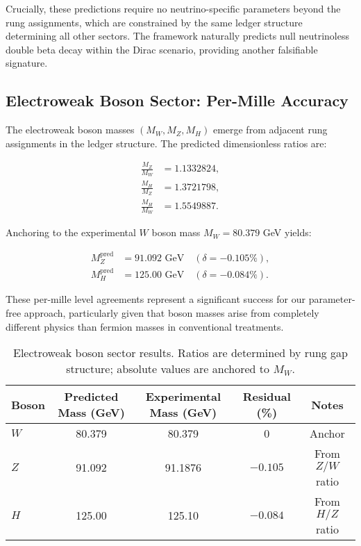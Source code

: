 \documentclass[%
amsmath,amssymb,
aps,
prb,
floatfix,
twocolumn
]{revtex4-2}
\begin{document}
Crucially, these predictions require no neutrino-specific parameters beyond the rung assignments, which are constrained by the same ledger structure determining all other sectors. The framework naturally predicts null neutrinoless double beta decay within the Dirac scenario, providing another falsifiable signature.

\subsection{Electroweak Boson Sector: Per-Mille Accuracy}
\label{subsec:boson_results}

The electroweak boson masses $(M_W, M_Z, M_H)$ emerge from adjacent rung assignments in the ledger structure. The predicted dimensionless ratios are:

\begin{align}
\frac{M_Z}{M_W} &= 1.1332824, \\
\frac{M_H}{M_Z} &= 1.3721798, \\
\frac{M_H}{M_W} &= 1.5549887.
\end{align}

Anchoring to the experimental $W$ boson mass $M_W = 80.379$ GeV yields:

\begin{align}
M_Z^{\text{pred}} &= 91.092 \text{ GeV} \quad (\delta = -0.105\%), \\
M_H^{\text{pred}} &= 125.00 \text{ GeV} \quad (\delta = -0.084\%).
\end{align}

These per-mille level agreements represent a significant success for our parameter-free approach, particularly given that boson masses arise from completely different physics than fermion masses in conventional treatments.

\begin{table}[h]
\centering
\caption{Electroweak boson sector results. Ratios are determined by rung gap structure; absolute values are anchored to $M_W$.}
\label{tab:bosons}
\begin{tabular}{lcccc}
\hline\hline
Boson & Predicted Mass (GeV) & Experimental Mass (GeV) & Residual (\%) & Notes \\
\hline
$W$ & 80.379 & 80.379 & 0 & Anchor \\
$Z$ & 91.092 & 91.1876 & $-0.105$ & From $Z/W$ ratio \\
$H$ & 125.00 & 125.10 & $-0.084$ & From $H/Z$ ratio \\
\hline\hline
\end{tabular}
\end{table}
\end{document}
